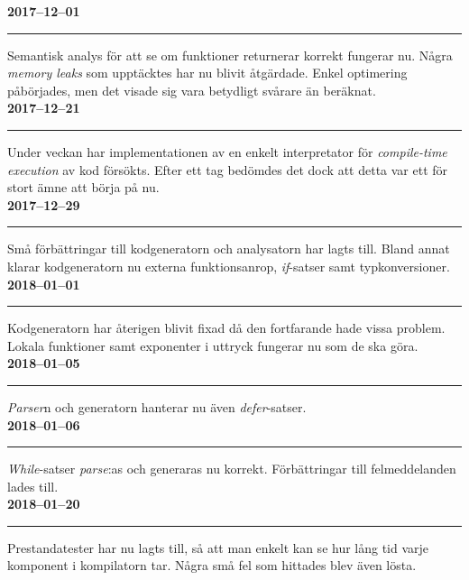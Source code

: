 \documentclass{theme}
\begin{document}
\noindent\textbf{2017--12--01}\\
\noindent\rule{\textwidth}{1pt}

\noindent
Semantisk analys för att se om funktioner returnerar korrekt fungerar nu. Några
\textit{memory leaks} som upptäcktes har nu blivit åtgärdade. Enkel optimering 
påbörjades, men det visade sig vara betydligt svårare än beräknat.\\

\noindent\textbf{2017--12--21}\\
\noindent\rule{\textwidth}{1pt}

\noindent
Under veckan har implementationen av en enkelt interpretator för
\textit{compile-time execution} av kod försökts. Efter ett tag bedömdes det dock
att detta var ett för stort ämne att börja på nu. \\

\noindent\textbf{2017--12--29}\\
\noindent\rule{\textwidth}{1pt}

\noindent
Små förbättringar till kodgeneratorn och analysatorn har lagts till. Bland annat
klarar kodgeneratorn nu externa funktionsanrop, \textit{if}-satser samt
typkonversioner.  \\

\noindent\textbf{2018--01--01}\\
\noindent\rule{\textwidth}{1pt}

\noindent
Kodgeneratorn har återigen blivit fixad då den fortfarande hade vissa problem.
Lokala funktioner samt exponenter i uttryck fungerar nu som de ska göra.\\

\noindent\textbf{2018--01--05}\\
\noindent\rule{\textwidth}{1pt}

\noindent
\textit{Parser}n och generatorn hanterar nu även \textit{defer}-satser. \\

\noindent\textbf{2018--01--06}\\
\noindent\rule{\textwidth}{1pt}

\noindent
\textit{While}-satser \textit{parse}:as och generaras nu korrekt. Förbättringar
till felmeddelanden lades till.\\

\noindent\textbf{2018--01--20}\\
\noindent\rule{\textwidth}{1pt}

\noindent
Prestandatester har nu lagts till, så att man enkelt kan se hur lång tid varje
komponent i kompilatorn tar. Några små fel som hittades blev även lösta.\\
\end{document}
